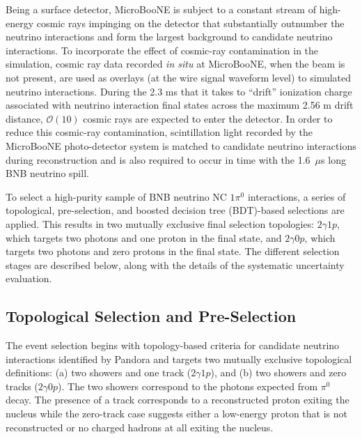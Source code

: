 Being a surface detector, MicroBooNE is subject to a constant stream of high-energy cosmic rays impinging on the detector that substantially outnumber the neutrino interactions and form the largest background to candidate neutrino interactions. To incorporate the effect of cosmic-ray contamination in the simulation, cosmic ray data recorded \textit{in situ} at MicroBooNE, when the beam is not present, are used as overlays (at the wire signal waveform level) to  simulated neutrino interactions. During the 2.3 ms that it takes to ``drift'' ionization charge associated with neutrino interaction final states across the maximum 2.56 m drift distance, $\mathcal{O}(10)$ cosmic rays are expected to enter the detector. In order to reduce this cosmic-ray contamination, scintillation light recorded by the MicroBooNE photo-detector system is matched to candidate neutrino interactions during reconstruction and is also required to occur in time with the 1.6~$\mu$s long BNB neutrino spill.  

To select a high-purity sample of BNB neutrino NC $1\pi^0$ interactions, a series of topological, pre-selection, and boosted decision tree (BDT)-based selections are applied. This results in two mutually exclusive final selection topologies: $2\gamma1p$, which targets two photons and one proton in the final state, and $2\gamma0p$, which targets two photons and zero protons in the final state. The different selection stages are described below, along with the details of the systematic uncertainty evaluation. 

\subsection{Topological Selection and Pre-Selection}

The event selection begins with topology-based criteria for candidate neutrino interactions identified by Pandora and targets two mutually exclusive topological definitions: (a) two showers and one track ($2\gamma 1p$), and (b) two showers and zero tracks ($2\gamma 0p$). The two showers correspond to the photons expected from $\pi^0$ decay. The presence of a track corresponds to a reconstructed proton exiting the nucleus while the zero-track case suggests either a low-energy proton that is not reconstructed or no charged hadrons at all exiting the nucleus. 


